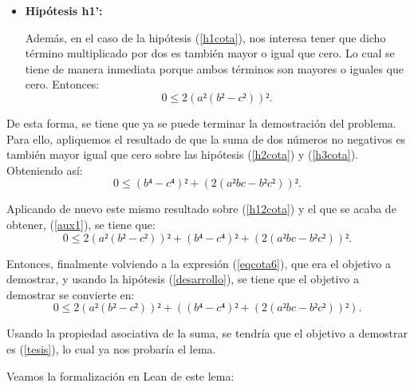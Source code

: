 \begin{demostracion}
\begin{itemize}
  \item\textbf{Hipótesis h1':}

    Además, en el caso de la hipótesis (\ref{h1cota}), nos interesa
    tener que dicho término multiplicado por dos es también mayor o
    igual que cero. Lo cual se tiene de manera inmediata porque ambos
    términos son mayores o iguales que cero. Entonces:
    \begin{equation}
      0 ≤ 2(a²(b²-c²))².\label{h12cota}\tag{h1'}
    \end{equation}
  \end{itemize}

  De esta forma, se tiene que ya se puede terminar la demostración del
  problema. Para ello, apliquemos el resultado de que la suma de dos
  números no negativos es también mayor igual que cero sobre las hipótesis
  (\ref{h2cota}) y (\ref{h3cota}). Obteniendo así:
  \begin{equation}\label{aux1}\tag{aux1}
    0 ≤ (b⁴-c⁴)²+(2(a²bc-b²c²))².
  \end{equation}

  Aplicando de nuevo este mismo resultado sobre (\ref{h12cota}) y el que
  se acaba de obtener, (\ref{aux1}), se tiene que:
  \begin{equation}\label{tesis}\tag{tesis}
    0 ≤ 2(a²(b²-c²))²+(b⁴-c⁴)²+(2(a²bc-b²c²))².
  \end{equation}

  Entonces, finalmente volviendo a la expresión (\ref{eqcota6}), que era
  el objetivo a demostrar, y usando la hipótesis (\ref{desarrollo}), se
  tiene que el objetivo a demostrar se convierte en:
  \begin{equation}
    0 ≤ 2(a²(b²-c²))²+((b⁴-c⁴)²+(2(a²bc-b²c²))²).
  \end{equation}

  Usando la propiedad asociativa de la suma, se tendría que el objetivo
  a demostrar es (\ref{tesis}), lo cual ya nos probaría el lema.
\end{demostracion}

Veamos la formalización en Lean de este lema:

